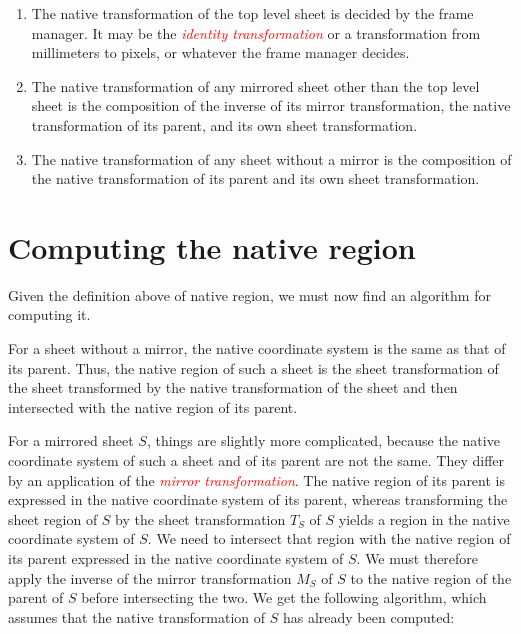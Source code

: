 \documentclass{article}
\newenvironment{enumerate0}{
\begin{enumerate}
\setlength{\parskip}{0cm}%
}
{\end{enumerate}}
\newcommand{\gloss}[1]{\textsl{\textcolor{red}{#1}}}
\begin{document}
\begin{enumerate0}
  
\item The native transformation of the top level sheet is decided by
  the frame manager.  It may be the \gloss{identity transformation} or
  a transformation from millimeters to pixels, or whatever the frame
  manager decides.
  
\item The native transformation of any mirrored sheet other than the
  top level sheet is the composition of the inverse of its mirror
  transformation, the native transformation of its parent, and its own
  sheet transformation.
  
\item The native transformation of any sheet without a mirror is the
  composition of the native transformation of its parent and its own
  sheet transformation.
\end{enumerate0}

\section{Computing the native region}

Given the definition above of native region, we must now find an
algorithm for computing it.  

For a sheet without a mirror, the native coordinate system is the same
as that of its parent.  Thus, the native region of such a sheet is the
sheet transformation of the sheet transformed by the native
transformation of the sheet and then intersected with the native
region of its parent. 

For a mirrored sheet $S$, things are slightly more complicated,
because the native coordinate system of such a sheet and of its parent
are not the same.  They differ by an application of the \gloss{mirror
transformation}.  The native region of its parent is expressed in the
native coordinate system of its parent, whereas transforming the sheet
region of $S$ by the sheet transformation $T_S$ of $S$ yields a region
in the native coordinate system of $S$.  We need to intersect that
region with the native region of its parent expressed in the native
coordinate system of $S$.  We must therefore apply the inverse of the
mirror transformation $M_S$ of $S$ to the native region of the parent
of $S$ before intersecting the two.   We get the following algorithm,
which assumes that the native transformation of $S$ has already been
computed: 
\end{document}
